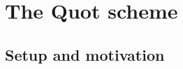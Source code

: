 \chapter{The Quot scheme}
\label{chap:Picard_QuotScheme}

%
%

\section{Setup and motivation}
\label{sec:quot_setup}

